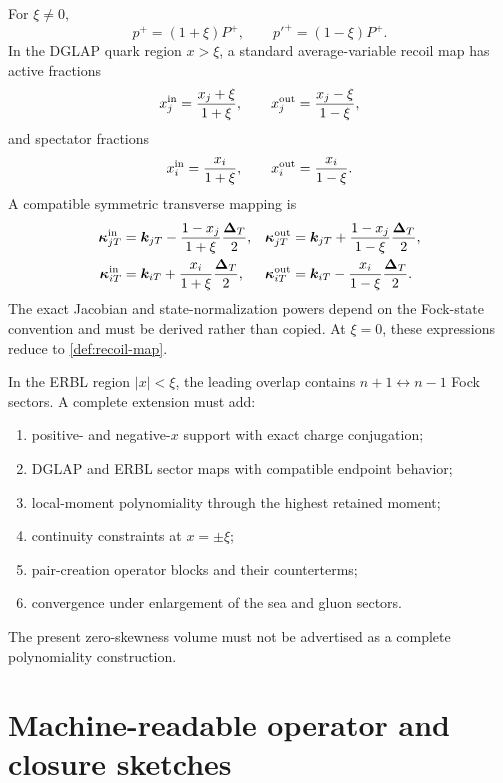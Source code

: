 \documentclass[11pt]{article}
\newcommand{\DT}{\bm{\Delta}_{T}}
\begin{document}
For \(\xi\ne0\),
\begin{equation}
 p^+=(1+\xi)P^+,
 \qquad
 p'^+=(1-\xi)P^+.
\label{eq:nonzero-xi-hadron}
\end{equation}
In the DGLAP quark region \(x>\xi\), a standard average-variable recoil map
has active fractions
\begin{equation}
 x_j^{\rm in}=\frac{x_j+\xi}{1+\xi},
 \qquad
 x_j^{\rm out}=\frac{x_j-\xi}{1-\xi},
\label{eq:nonzero-xi-active-fractions}
\end{equation}
and spectator fractions
\begin{equation}
 x_i^{\rm in}=\frac{x_i}{1+\xi},
 \qquad
 x_i^{\rm out}=\frac{x_i}{1-\xi}.
\label{eq:nonzero-xi-spectator-fractions}
\end{equation}
A compatible symmetric transverse mapping is
\begin{align}
 \bm\kappa_{jT}^{\rm in}
 &=\bm{k}_{jT}-\frac{1-x_j}{1+\xi}\frac{\DT}{2},
 &\bm\kappa_{jT}^{\rm out}
 &=\bm{k}_{jT}+\frac{1-x_j}{1-\xi}\frac{\DT}{2},
\label{eq:nonzero-xi-active-recoil}\\
 \bm\kappa_{iT}^{\rm in}
 &=\bm{k}_{iT}+\frac{x_i}{1+\xi}\frac{\DT}{2},
 &\bm\kappa_{iT}^{\rm out}
 &=\bm{k}_{iT}-\frac{x_i}{1-\xi}\frac{\DT}{2}.
\label{eq:nonzero-xi-spectator-recoil}
\end{align}
The exact Jacobian and state-normalization powers depend on the Fock-state
convention and must be derived rather than copied.  At \(\xi=0\), these
expressions reduce to \cref{def:recoil-map}.

In the ERBL region \(|x|<\xi\), the leading overlap contains
\(n+1\leftrightarrow n-1\) Fock sectors.  A complete extension must add:
\begin{enumerate}
\item positive- and negative-\(x\) support with exact charge conjugation;
\item DGLAP and ERBL sector maps with compatible endpoint behavior;
\item local-moment polynomiality through the highest retained moment;
\item continuity constraints at \(x=\pm\xi\);
\item pair-creation operator blocks and their counterterms;
\item convergence under enlargement of the sea and gluon sectors.
\end{enumerate}
The present zero-skewness volume must not be advertised as a complete
polynomiality construction.

\section{Machine-readable operator and closure sketches}
\label{app:machine-readable}
\end{document}

